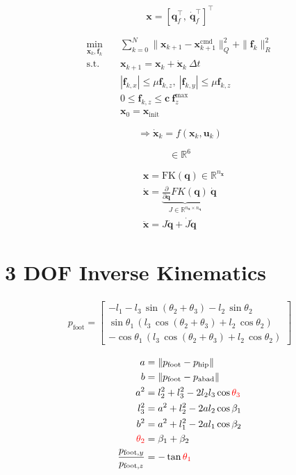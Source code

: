 \documentclass[11pt]{article}
\newcommand{\red}[1]{\textcolor{red}{#1}}
\newcommand{\pd}[2][]{ \frac{\partial #1}{\partial #2}} %
\newcommand{\T}{^\top}          %
\begin{document}
\[
\mathbf{x} = [\bm{q}_f\T,\ \dot{\bm{q}}_f\T]\T
\]

\begin{align*}
  \min_{\mathbf{x}_k, \mathbf{f}_k} \quad
  & \sum_{k=0}^{N}\|\mathbf{x}_{k+1} - \mathbf{x}^{\text{cmd}}_{k+1}\|^2_{Q} + \|\mathbf{f}_k\|^2_{R}\\
  \text{s.t.} \quad
  & \mathbf{x}_{k+1} = \mathbf{x}_k + \dot{\mathbf{x}}_k \ \Delta t\\
  & |\mathbf{f}_{k, x}| \leq \mu \mathbf{f}_{k, z}, \ 
  |\mathbf{f}_{k, y}| \leq \mu \mathbf{f}_{k, z}\\
  & 0 \leq \mathbf{f}_{k, z} \leq  \mathbf{c} \ \mathbf{f}_{z}^{\text{max}}\\
  & \mathbf{x}_0 = \mathbf{x}_{\text{init}}
\end{align*}

\[
\Rightarrow \dot{\mathbf{x}}_{k} = f(\mathbf{x}_k, \mathbf{u}_k)
\]

\[
\in\mathbb{R}^{6}
\]

\begin{align*}
  & \mathbf{x} = \text{FK}(\bm{q}) \in\mathbb{R}^{n_\mathbf{x}}\\
  & \dot{\mathbf{x}} = \underbrace{\pd{\bm{q}}FK(\bm{q})}_{J\in\mathbb{R}^{n_{\mathbf{x}}\times n_{\bm{q}}}} \ \dot{\bm{q}}\\
  & \ddot{\mathbf{x}} = J\ddot{\bm{q}} + \dot{J} \dot{\bm{q}}
\end{align*}

\clearpage

\section*{3 DOF Inverse Kinematics}

\begin{align*}
  p_{\text{foot}} = 
  \begin{bmatrix}
    -l_1 -l_3 \,\sin \left(\theta_2 +\theta_3 \right)-l_2 \,\sin \theta_2\\
    \sin \theta_1\,{\left(l_3 \,\cos \left(\theta_2 +\theta_3 \right)+l_2 \,\cos \theta_2\right)}\\
    -\cos \theta_1\,{\left(l_3 \,\cos \left(\theta_2 +\theta_3 \right)+l_2 \,\cos \theta_2\right)}    
  \end{bmatrix}
\end{align*}


\begin{align*}
  a &= \|p_{\text{foot}} - p_{\text{hip}}\|\\
  b &= \|p_{\text{foot}} - p_{\text{abad}}\|\\
  a^2&=l_2^2+l_3^2-2 l_2 l_3 \cos \red{\theta_3} \\
  l_3^2&=a^2+l_2^2-2 a l_2 \cos \beta_1 \\
  b^2&=a^2+l_1^2-2 a l_1 \cos \beta_2 \\
  \red{\theta_2}&=\beta_1+\beta_2 \\
  \frac{p_{\text{foot}, y}}{p_{\text{foot}, z}} &= -\tan \red{\theta_1}
\end{align*}
\end{document}
